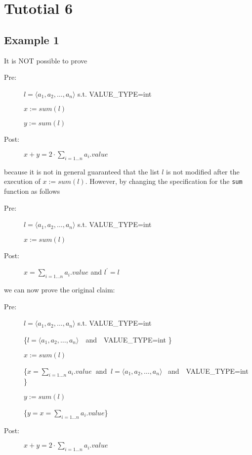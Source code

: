 \documentclass[english]{article}
\begin{document}

\pagestyle{fancy}
 \chead{}


\section*{Tutotial 6}

\subsection*{Example 1}

It is NOT possible to prove
\begin{description}
\item[Pre:] $l=\langle a_1,a_2,\ldots,a_n \rangle$ s.t. VALUE\_TYPE=int
\item[]$x:=sum(l)$
\item[]$y:=sum(l)$
\item[Post:]$x+y=2\cdot\sum_{i=1\ldots n}a_i.value$
\end{description}
because it is not in general guaranteed that the list $l$
is not modified after the execution of $x:=sum(l)$.
However, by changing the specification for the {\tt sum} function
as follows
\begin{description}
\item[Pre:] $l=\langle a_1,a_2,\ldots,a_n \rangle$ s.t. VALUE\_TYPE=int
\item[]$x:=sum(l)$
\item[Post:]$x=\sum_{i=1\ldots n}a_i.value$ and \underline{$l^\prime=l$}
\end{description}
we can now prove the original claim:
\begin{description}
\item[Pre:] $l=\langle a_1,a_2,\ldots,a_n \rangle$ s.t. VALUE\_TYPE=int
\item[]\hspace{1cm}\{$l=\langle a_1,a_2,\ldots,a_n \rangle$\  \mbox{ and \ 
 VALUE\_TYPE=int} \}
\item[]$x:=sum(l)$
\item[]\hspace{1cm}\{$x=\sum_{i=1\ldots n}a_i.value \ \mbox{ and } \
l=\langle a_1,a_2,\ldots,a_n \rangle$   \mbox{ and \ 
 VALUE\_TYPE=int} \}
\item[]$y:=sum(l)$
\item[]\hspace{1cm}\{$y=x=\sum_{i=1\ldots n}a_i.value$\}
\item[Post:]$x+y=2\cdot\sum_{i=1\ldots n}a_i.value$
\end{description}
\end{document}
